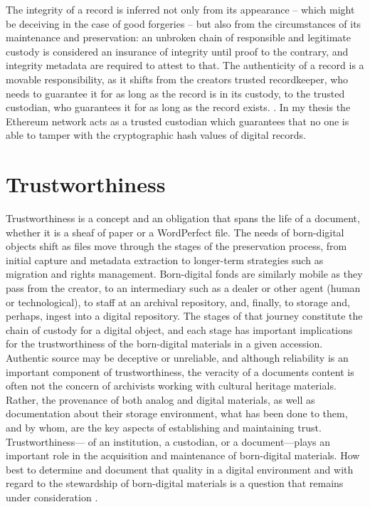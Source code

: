 The integrity of a record is inferred not only from its appearance – which might be deceiving in the case of good forgeries – but also from the circumstances of its maintenance and preservation: an unbroken chain of responsible and legitimate custody is considered an insurance of integrity until proof to the contrary, and integrity metadata are required to attest to that. The authenticity of a record is a movable responsibility, as it shifts from the creators trusted recordkeeper, who needs to guarantee it for as long as the record is in its custody, to the trusted custodian, who guarantees it for as long as the record exists. \cite[53]{duranti2009digital}. In my thesis the Ethereum network acts as a trusted custodian which guarantees that no one is able to tamper with the cryptographic hash values of digital records.

\section{Trustworthiness}
Trustworthiness is a concept and an obligation that spans the life of a document, whether it is a sheaf of paper or a WordPerfect file. The needs of born-digital objects shift as files move through the stages of the preservation process, from initial capture and metadata extraction to longer-term strategies such as migration and rights management. Born-digital fonds are similarly mobile as they pass from the creator, to an intermediary such as a dealer or other agent (human or technological), to staff at an archival repository, and, finally, to storage and, perhaps, ingest into a digital repository. The stages of that journey constitute the chain of custody for a digital object, and each stage has important implications for the trustworthiness of the born-digital materials in a given accession. Authentic source may be deceptive or unreliable, and although reliability is an important component of trustworthiness, the veracity of a documents content is often not the concern of archivists working with cultural heritage materials. Rather, the provenance of both analog and digital materials, as well as documentation about their storage environment, what has been done to them, and by whom, are the key aspects of establishing and maintaining trust. Trustworthiness— of an institution, a custodian, or a document—plays an important role in the acquisition and maintenance of born-digital materials. How best to determine and document that quality in a digital environment and with regard to the stewardship of born-digital materials is a question that remains under consideration \cite[27]{kirschenbaum2010digital}. 


